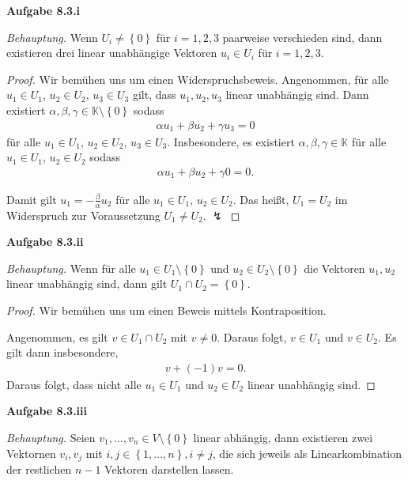 \documentclass[12pt]{extarticle}
\newcommand{\mg}[1]{\mathbb{#1}}
\begin{document}
\textbf{Aufgabe 8.3.i}

\textit{Behauptung.}  Wenn $U_i \neq \left\{ 0
\right\}$ für \(i = 1,2,3\) paarweise verschieden sind,
dann existieren drei linear unabhängige Vektoren $u_i
\in U_i$ für \(i = 1,2,3\).

\begin{proof}
  Wir bemühen uns um einen Widerspruchsbeweis.
  Angenommen, für alle \(u_1 \in U_1\), \(u_2 \in U_2\),
  \(u_3 \in U_3\) gilt, dass \(u_1, u_2, u_3\) linear
  unabhängig sind.  Dann existiert
  $\alpha, \beta, \gamma \in \mg{K} \setminus \left\{ 0
  \right\}$ sodass
\begin{align*}
\alpha u_1 + \beta u_2 + \gamma u_3 = 0
\end{align*}
für alle \(u_1 \in U_1\), \(u_2 \in U_2\), \(u_3 \in U_3\).
Insbesondere, es existiert
\(\alpha, \beta, \gamma \in \mg{K}\) für alle $u_1 \in
U_1$, \(u_2 \in U_2\) sodass
\begin{align*}
\alpha u_1 + \beta u_2 + \gamma 0 = 0.
\end{align*}

Damit gilt \(u_1 = -\frac{\beta}{\alpha}u_2\) für alle
\(u_1 \in U_1\), \(u_2 \in U_2\).  Das heißt, \(U_1 = U_2\)
im Widerspruch zur Voraussetzung \(U_1 \neq U_2\). \(\lightning\)
\end{proof}

\textbf{Aufgabe 8.3.ii}

\textit{Behauptung.} Wenn für alle
\(u_1 \in U_1 \setminus \left\{ 0 \right\}\) und
\(u_2 \in U_2 \setminus \left\{ 0 \right\}\) die Vektoren
\(u_1, u_2\) linear unabhängig sind, dann gilt
\(U_1 \cap U_2 = \left\{ 0 \right\}\).

\begin{proof}
  Wir bemühen uns um einen Beweis mittels
  Kontraposition.

  Angenommen, es gilt \(v \in U_1 \cap U_2\) mit
  \(v \neq 0\).  Daraus folgt, \(v \in U_1\) und
  \(v \in U_2\).  Es gilt dann insbesondere,
\begin{align*}
v + (-1) v = 0.
\end{align*}
Daraus folgt, dass nicht alle \(u_1 \in U_1\) und $u_2
\in U_2$ linear unabhängig sind.
\end{proof}

\textbf{Aufgabe 8.3.iii}

\textit{Behauptung.}  Seien $v_1, \ldots, v_n \in V
\setminus \left\{ 0 \right\}$ linear abhängig, dann
existieren zwei Vektornen \(v_i, v_j\) mit $i, j \in
\left\{ 1, \ldots, n \right\}, i \neq j$, die sich
jeweils als Linearkombination der restlichen \(n-1\)
Vektoren darstellen lassen.
\end{document}
